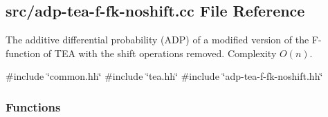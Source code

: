 \hypertarget{adp-tea-f-fk-noshift_8cc}{\subsection{src/adp-\/tea-\/f-\/fk-\/noshift.cc \-File \-Reference}
\label{adp-tea-f-fk-noshift_8cc}
}


\-The additive differential probability (\-A\-D\-P) of a modified version of the \-F-\/function of \-T\-E\-A with the shift operations removed. \-Complexity $O(n)$.  


{\ttfamily \#include \char`\"{}common.\-hh\char`\"{}}\*
{\ttfamily \#include \char`\"{}tea.\-hh\char`\"{}}\*
{\ttfamily \#include \char`\"{}adp-\/tea-\/f-\/fk-\/noshift.\-hh\char`\"{}}\*
\subsubsection*{\-Functions}
